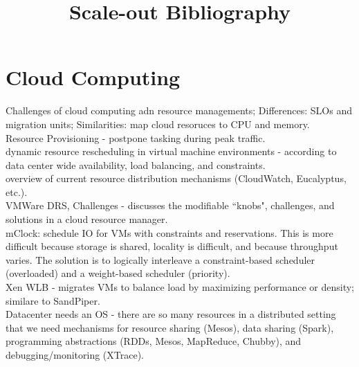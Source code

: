 \documentclass{article}
\begin{document}
\title{Scale-out Bibliography}

\maketitle

\section{Cloud Computing}

\noindent\cite{zhang:journal2010-cloud-challenges} Challenges of cloud computing adn resource managements; Differences: SLOs and migration units; Similarities: map cloud resoruces to CPU and memory. \\

\noindent\cite{vilutis:ITI2012-cloud-load-balancing} Resource Provisioning - postpone tasking during peak traffic. \\

\noindent\cite{quiroz:grid2009-cloud-workload-provisioning} dynamic resource rescheduling in virtual machine environments - according to data center wide availability, load balancing, and constraints.\\

\noindent\cite{ranjan:cloud-computing2010-peer-to-peer} overview of current resource distribution mechanisms (CloudWatch, Eucalyptus, etc.).\\

\noindent\cite{gulati:hotcloud2011-cloud-resource-management} VMWare DRS, Challenges - discusses the modifiable ``knobs", challenges, and solutions in a cloud resource manager.\\

\noindent\cite{gulati:osdi2010-mclock} mClock: schedule IO for VMs with constraints and reservations. This is more difficult because storage is shared, locality is difficult, and because throughput varies. The solution is to logically interleave a constraint-based scheduler (overloaded) and a weight-based scheduler (priority).\\ 

\noindent\cite{xen-wlb} Xen WLB -  migrates VMs to balance load by maximizing performance or density; similare to SandPiper.\\

\noindent\cite{zaharia:hotcloud2011-datacenter-OS} Datacenter needs an OS - there are so many resources in a distributed setting that we need mechanisms for resource sharing (Mesos), data sharing (Spark), programming abstractions (RDDs, Mesos, MapReduce, Chubby), and debugging/monitoring (XTrace). \\
\end{document}
